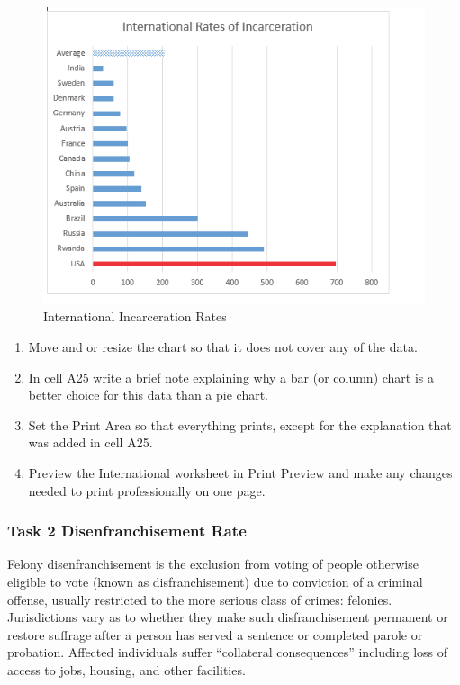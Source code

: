 \begin{figure}[H]
	\centering
	\includegraphics[width=\maxwidth{.95\linewidth}]{gfx/ch04_fig53}
	\caption{International Incarceration Rates}
	\label{04:fig53}
\end{figure}

\begin{enumerate}
	\item Move and or resize the chart so that it does not cover any of the data.
	\item In cell \textsf{A25} write a brief note explaining why a bar (or column) chart is a better choice for this data than a pie chart.
	\item Set the Print Area so that everything prints, except for the explanation that was added in cell \textsf{A25}.
	\item Preview the International worksheet in Print Preview and make any changes needed to print professionally on one page.
\end{enumerate}

\subsubsection{Task 2 Disenfranchisement Rate}

Felony disenfranchisement is the exclusion from voting of people otherwise eligible to vote (known as disfranchisement) due to conviction of a criminal offense, usually restricted to the more serious class of crimes: felonies. Jurisdictions vary as to whether they make such disfranchisement permanent or restore suffrage after a person has served a sentence or completed parole or probation. Affected individuals suffer ``collateral consequences'' including loss of access to jobs, housing, and other facilities.

